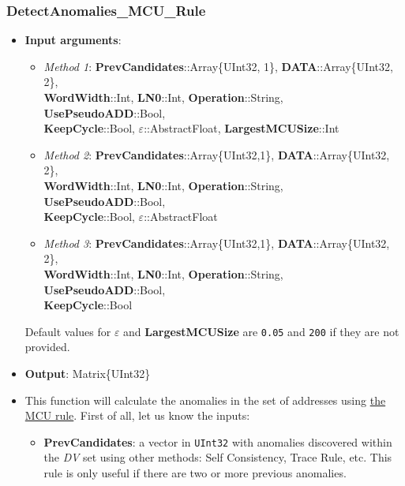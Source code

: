  \subsubsection*{DetectAnomalies\_MCU\_Rule}\label{Fun:DetectAnomaliesMCURule}
 \begin{itemize}
 	\item \textbf{Input arguments}: 
 	\begin{itemize}

 		\item \textit{Method 1}: \textbf{PrevCandidates}::Array\{UInt32, 1\}, \textbf{DATA}::Array\{UInt32, 2\}, \\ \textbf{WordWidth}::Int, \textbf{LN0}::Int,  \textbf{Operation}::String, \textbf{UsePseudoADD}::Bool, \\ \textbf{KeepCycle}::Bool, \textbf{\(\varepsilon\)}::AbstractFloat, \textbf{LargestMCUSize}::Int
 		\item \textit{Method 2}:
 		\textbf{PrevCandidates}::Array\{UInt32,1\}, \textbf{DATA}::Array\{UInt32, 2\}, \\ \textbf{WordWidth}::Int, \textbf{LN0}::Int,  \textbf{Operation}::String, \textbf{UsePseudoADD}::Bool, \\ \textbf{KeepCycle}::Bool,  \textbf{\(\varepsilon\)}::AbstractFloat
 		\item \textit{Method 3}: 			%
 		\textbf{PrevCandidates}::Array\{UInt32,1\}, \textbf{DATA}::Array\{UInt32, 2\}, \\ \textbf{WordWidth}::Int, \textbf{LN0}::Int,  \textbf{Operation}::String, \textbf{UsePseudoADD}::Bool,\\ \textbf{KeepCycle}::Bool
 	\end{itemize}
 	Default values for \textbf{\(\varepsilon\)} and \textbf{LargestMCUSize} are \texttt{0.05} and \texttt{200} if they are not provided.
 	\item \textbf{Output}: Matrix\{UInt32\}
 	\item This function will calculate the anomalies in the set of addresses using \hyperref[Subsec:MCURule]{the MCU rule}. 
 	First of all, let us know the inputs:
 	\begin{itemize}
 		
 		\item \textbf{PrevCandidates}: a vector in \texttt{UInt32} with anomalies discovered within the \textit{DV} set using other methods: Self Consistency, Trace Rule, etc. This rule is only useful if there are two or more previous anomalies. 
 		

\end{itemize}
\end{itemize}
